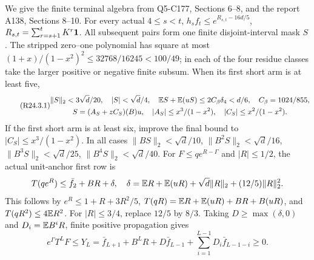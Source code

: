 We give the finite terminal algebra from Q5-C177, Sections 6--8,
and the report A138, Sections 8--10.
For every actual $4\le s<t$,
$h_sf_t\le e^{R_{s,t}-16d/5}$,
$R_{s,t}=\sum_{r=s+1}^tK^r\mathbf1$.
All subsequent pairs form one finite disjoint-interval mask $S$.
The stripped zero--one polynomial has square at most
$(1+x)/(1-x^2)^2\le32768/16245<100/49$; in each of the four
residue classes take the larger positive or negative finite subsum.
When its first short arm is at least five,
\begin{equation}\tag{R24.3.1}\label{eq:R24:mask}
\begin{gathered}
\|S\|_2<3\sqrt d/20,\quad|S|<\sqrt d/4,\quad
\mathbb E S+\mathbb E(uS)\le2C_\beta\delta_4<d/6,\quad C_\beta=1024/855,\\
S=(A_S+zC_S)(B)u,\quad
|A_S|\le x^3/(1-x^2),\quad |C_S|\le x^2/(1-x^2).
\end{gathered}
\end{equation}
If the first short arm is at least six, improve the final bound to
$|C_S|\le x^3/(1-x^2)$. In all cases
$\|BS\|_2<\sqrt d/10$, $\|B^2S\|_2<\sqrt d/16$,
$\|B^3S\|_2<\sqrt d/25$, $\|B^4S\|_2<\sqrt d/40$.
For $F\le qe^{R-\Gamma}$ and $|R|\le1/2$, the actual unit-anchor
first row is
\[
T(qe^R)\le\bar f_2+BR+\delta,\quad
\delta=\mathbb E R+\mathbb E(uR)+\sqrt d\|R\|_2+(12/5)\|R\|_2^2.
\]
This follows by $e^R\le1+R+3R^2/5$,
$T(qR)=\mathbb E R+\mathbb E(uR)+BR+B(uR)$, and $T(qR^2)\le4\mathbb E R^2$.
For $|R|\le3/4$, replace $12/5$ by $8/3$.
Taking $D\ge\max(\delta,0)$ and $D_i=\mathbb E B^iR$, finite positive
propagation gives
\begin{equation}\tag{R24.3.3}\label{eq:R24:propagation}
e^\Gamma T^LF\le Y_L=\bar f_{L+1}+B^LR+D\bar f_{L-1}
+\sum_{i=1}^{L-1}D_i\bar f_{L-1-i}\ge0.
\end{equation}

